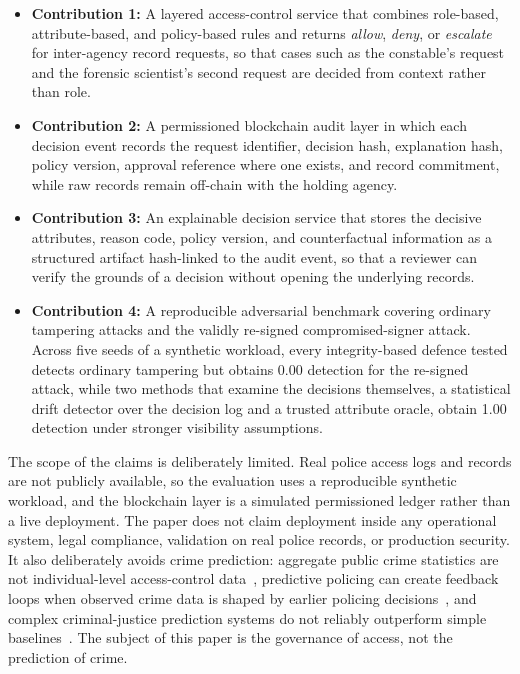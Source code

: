 \begin{itemize}
    \item \textbf{Contribution 1:} A layered access-control service that
    combines role-based, attribute-based, and policy-based rules and returns
    \emph{allow}, \emph{deny}, or \emph{escalate} for inter-agency record
    requests, so that cases such as the constable's request and the forensic
    scientist's second request are decided from context rather than role.

    \item \textbf{Contribution 2:} A permissioned blockchain audit layer in
    which each decision event records the request identifier, decision hash,
    explanation hash, policy version, approval reference where one exists, and
    record commitment, while raw records remain off-chain with the holding
    agency.

    \item \textbf{Contribution 3:} An explainable decision service that stores
    the decisive attributes, reason code, policy version, and counterfactual
    information as a structured artifact hash-linked to the audit event, so that
    a reviewer can verify the grounds of a decision without opening the
    underlying records.

    \item \textbf{Contribution 4:} A reproducible adversarial benchmark covering
    ordinary tampering attacks and the validly re-signed compromised-signer
    attack. Across five seeds of a synthetic workload, every integrity-based
    defence tested detects ordinary tampering but obtains 0.00 detection for the
    re-signed attack, while two methods that examine the decisions themselves, a
    statistical drift detector over the decision log and a trusted attribute
    oracle, obtain 1.00 detection under stronger visibility assumptions.
\end{itemize}

The scope of the claims is deliberately limited. Real police access logs and
records are not publicly available, so the evaluation uses a reproducible
synthetic workload, and the blockchain layer is a simulated permissioned ledger
rather than a live deployment. The paper does not claim deployment inside any
operational system, legal compliance, validation on real police records, or
production security. It also deliberately avoids crime prediction: aggregate
public crime statistics are not individual-level access-control
data~\cite{ncrb_2023}, predictive policing can create feedback loops when
observed crime data is shaped by earlier policing
decisions~\cite{ensign_feedback_2018}, and complex criminal-justice prediction
systems do not reliably outperform simple
baselines~\cite{dressel_fairness_limits_2018}. The subject of this paper is the
governance of access, not the prediction of crime.

